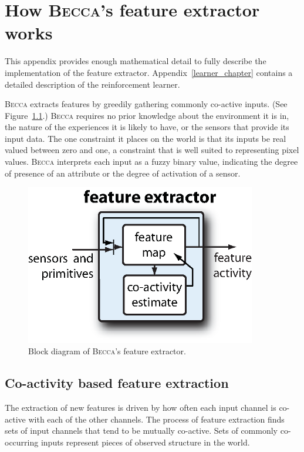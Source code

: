 \chapter{How \textsc{Becca}'s feature extractor works}
\label{perceiver_chapter}

This appendix provides enough mathematical detail to fully describe the implementation of the feature extractor. Appendix~\ref{learner_chapter} contains a detailed description of the reinforcement learner.

\textsc{Becca} extracts features by greedily gathering commonly co-active inputs. (See Figure~\ref{becca_feature_extractor}.)  \textsc{Becca} requires no prior knowledge about the environment it is in, the nature of the experiences it is likely to have, or the sensors that provide its input data. The one constraint it places on the world is that its inputs be real valued between zero and one, a constraint that is well suited to representing pixel values. \textsc{Becca} interprets each input as a fuzzy binary value, indicating the degree of presence of an attribute or the degree of activation of a sensor.

\begin{figure}
\centering
\includegraphics[height=7cm]{figs/becca_feature_extractor.eps}
\caption{Block diagram of \textsc{Becca}'s feature extractor.}
\label{becca_feature_extractor}
\end{figure}


\section{Co-activity based feature extraction}
The extraction of new features is driven by how often each input channel is co-active with each of the other channels. The process of feature extraction finds sets of input channels that tend to be mutually co-active. Sets of commonly co-occurring inputs represent pieces of observed structure in the world.

